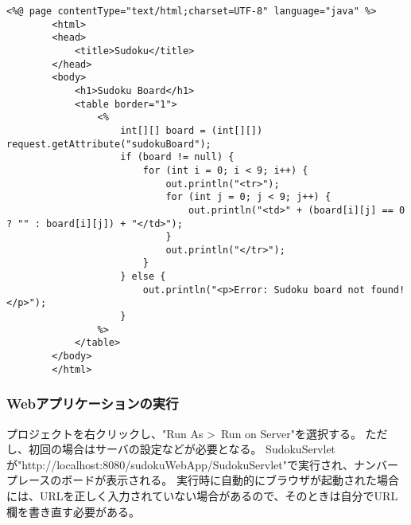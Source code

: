 \documentclass[a4paper,10pt]{jsarticle}
\begin{document}
      \begin{lstlisting}[caption="sudoku.jsp"のコード例,label=sudoku_jsp]
        <%@ page contentType="text/html;charset=UTF-8" language="java" %>
        <html>
        <head>
            <title>Sudoku</title>
        </head>
        <body>
            <h1>Sudoku Board</h1>
            <table border="1">
                <%
                    int[][] board = (int[][]) request.getAttribute("sudokuBoard");
                    if (board != null) {
                        for (int i = 0; i < 9; i++) {
                            out.println("<tr>");
                            for (int j = 0; j < 9; j++) {
                                out.println("<td>" + (board[i][j] == 0 ? "" : board[i][j]) + "</td>");
                            }
                            out.println("</tr>");
                        }
                    } else {
                        out.println("<p>Error: Sudoku board not found!</p>");
                    }
                %>
            </table>
        </body>
        </html>
      \end{lstlisting}
    \subsubsection{Webアプリケーションの実行}
      プロジェクトを右クリックし、"Run As \textgreater \ Run on Server"を選択する。
      ただし、初回の場合はサーバの設定などが必要となる。
      SudokuServletが"http://localhost:8080/sudokuWebApp/SudokuServlet"で実行され、ナンバープレースのボードが表示される。
      実行時に自動的にブラウザが起動された場合には、URLを正しく入力されていない場合があるので、そのときは自分でURL欄を書き直す必要がある。
      
\end{document}
